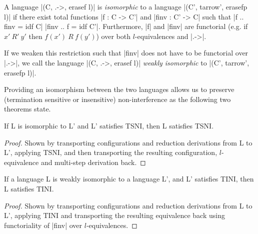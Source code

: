 \begin{definition}
  A language |(C, .->, erasef l)| is \textit{isomorphic} to a
  language |(C', tarrow', erasefp l)| if there exist total functions |f
  : C -> C'| and |finv : C' -> C| such that |f .. finv = idf C| |finv
  .. f = idf C'|.  Furthermore, |f| and |finv| are functorial (e.g. if
  $x'\ R'\ y'$ then $f(x')\ R\ f(y')$) over both
  $l$-equivalences and |.->|.
  
  If we weaken this restriction such that |finv| does
  not have to be functorial over |.->|, we call the
  language |(C, .->, erasef l)| \textit{weakly isomorphic} to
  |(C', tarrow', erasefp l)|.
\end{definition}

Providing an isomorphism between the two languages allows us to
preserve (termination sensitive or insensitive) non-interference
as the following two theorems state.

\begin{theorem}
  \label{thm:iso-tsni}
  If L is isomorphic to L' and L' satisfies TSNI, then
  L satisfies TSNI.
\end{theorem}

\begin{proof}
  Shown by transporting configurations and reduction derivations from
  L to L', applying TSNI, and then transporting the
  resulting configuration, $l$-equivalence and multi-step derivation back.
\end{proof}

\begin{theorem}
  \label{thm:iso-tini}
  If a language L is weakly isomorphic to a language L', and L'
  satisfies TINI, then L satisfies TINI.
\end{theorem}

\begin{proof}
  Shown by transporting configurations and reduction derivations
  from L to L', applying TINI and transporting the resulting
  equivalence back using functoriality of |finv| over $l$-equivalences.
\end{proof}

